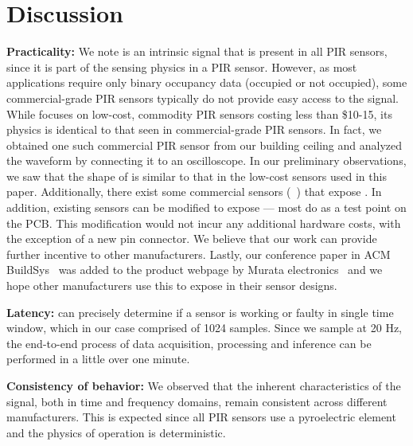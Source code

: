 \section{Discussion}

\noindent\textbf{Practicality:} We note \aout is an intrinsic signal that is present in all PIR sensors, since it is part of the sensing physics in a PIR sensor. 
%
However, as most applications require only binary occupancy data (\ie occupied or not occupied), some commercial-grade PIR sensors typically do not provide easy access to the \aout signal.
%
While \sol focuses on low-cost, commodity PIR sensors costing less than \$10-15, its physics is identical to that seen in commercial-grade PIR sensors. In fact, we obtained one such commercial PIR sensor from our building ceiling and analyzed the \aout waveform by connecting it to an oscilloscope. In our preliminary observations, we saw that the shape of \aout is similar to that in the low-cost sensors used in this paper.
%
Additionally, there exist some commercial sensors (\eg~\cite{panasonic_amn22111,panasonic_amn23111}) that expose \aout.
%
In addition, existing sensors can be modified to expose \aout --- most do as a test point on the PCB. This modification would not incur any additional hardware costs, with the exception of a new pin connector. We believe that our work can provide further incentive to other manufacturers. Lastly, our conference paper in ACM BuildSys~\cite{10.1145/3486611.3486658} was added to the product webpage by Murata electronics~\cite{murata_imx070_manual} and we hope other manufacturers use this to expose \aout in their sensor designs.
%

\noindent \textbf{Latency:} \sol can precisely determine if a sensor is working or faulty in single time window, which in our case comprised of 1024 samples. Since we sample at 20 Hz, the end-to-end process of data acquisition, processing and inference can be performed in a little over one minute.
%

\noindent\textbf{Consistency of behavior:} We observed that the inherent characteristics of the \aout signal, both in time and frequency domains, remain consistent across different manufacturers. This is expected since all PIR sensors use a pyroelectric element and the physics of operation is deterministic.
%

